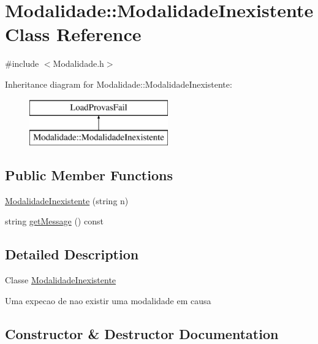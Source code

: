 \hypertarget{class_modalidade_1_1_modalidade_inexistente}{}\section{Modalidade\+:\+:Modalidade\+Inexistente Class Reference}
\label{class_modalidade_1_1_modalidade_inexistente}


{\ttfamily \#include $<$Modalidade.\+h$>$}

Inheritance diagram for Modalidade\+:\+:Modalidade\+Inexistente\+:\begin{figure}[H]
\begin{center}
\leavevmode
\includegraphics[height=2.000000cm]{class_modalidade_1_1_modalidade_inexistente}
\end{center}
\end{figure}
\subsection*{Public Member Functions}
\begin{DoxyCompactItemize}
\item 
\hyperlink{class_modalidade_1_1_modalidade_inexistente_abdc878e781526984595175bac47dd440}{Modalidade\+Inexistente} (string n)
\item 
string \hyperlink{class_modalidade_1_1_modalidade_inexistente_a79c5f308a9654ca8c08fdaac9fb6680f}{get\+Message} () const 
\end{DoxyCompactItemize}


\subsection{Detailed Description}
Classe \hyperlink{class_modalidade_1_1_modalidade_inexistente}{Modalidade\+Inexistente}

Uma expecao de nao existir uma modalidade em causa 

\subsection{Constructor \& Destructor Documentation}
\hypertarget{class_modalidade_1_1_modalidade_inexistente_abdc878e781526984595175bac47dd440}{}
